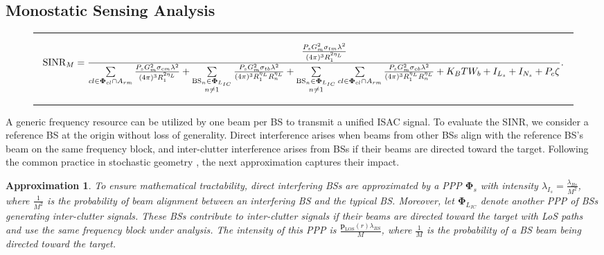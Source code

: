 \documentclass[journal]{IEEEtran}
\newtheorem{approximation}{\textbf{Approximation}}
\begin{document}
\subsection{Monostatic Sensing Analysis}



\begin{figure*}
\hrule
\begin{equation}\label{scnr_mono}
\text{SINR}_M=\frac{\frac{P_s  G_{m}^2 \sigma_{tm}  \lambda^2  }{(4\pi)^3 R_{1}^{2 \eta_L}}}{\sum\limits_{cl\in \bold\Phi_{cl}\cap A_{rm}}\frac{P_s G_{m}^2 \sigma_{cm} \lambda^2 }{(4\pi)^3 R_{1}^{2 \eta_L}}+\sum\limits_{\substack{\text{BS}_{n }\in \bold\Phi_{L_{IC}}\\ n \neq 1}} \frac{P_s  G_{m}^2 \sigma_{tb}  \lambda^2  }{(4\pi)^3 R_1^{\eta_L}  R_n^{\eta_L}}+\sum\limits_{\substack{\text{BS}_{n}\in \bold\Phi_{L_{IC}}\\ n \neq 1}}\sum\limits_{cl\in \bold\Phi_{cl}\cap A_{rm}}\frac{P_s  G_{m}^2 \sigma_{cb}  \lambda^2  }{(4\pi)^3 R_1^{\eta_L}  R_n^{\eta_L}}+K_B T W_b+I_{L_s}+I_{N_s}+ P_c \zeta  }.
\end{equation}
\hrule
\end{figure*}
A generic frequency resource can be utilized by one beam per BS to transmit a unified ISAC signal. 
To evaluate the SINR, we consider a reference BS at the origin without loss of generality. Direct interference arises when beams from other BSs align with the reference BS’s beam on the same frequency block, and inter-clutter interference arises from BSs if their beams are directed toward the target. Following the common practice in stochastic geometry \cite{elsawy2016modeling}, the next approximation captures their impact.
\begin{approximation}
To ensure mathematical tractability, direct interfering BSs are approximated by a PPP \(\boldsymbol{\Phi}_{s}\) with intensity \(\lambda_{I_s} =   \frac{\lambda_{Bs}}{M^2}\), where \(\frac{1}{M^2}\) is the probability of beam alignment between an interfering BS and the typical BS.  Moreover, let \(\boldsymbol{\Phi}_{L_{IC}}\) denote another PPP of BSs generating inter-clutter signals. These BSs contribute to inter-clutter signals if their beams are directed toward the target with LoS paths and use the same frequency block under analysis. The intensity of this PPP is \( \frac{\boldsymbol{p}_{\text{LOS}}(r) \lambda_{BS}}{M}\), where \(\frac{1}{M}\) is the probability of a BS beam being directed toward the target.
\label{approx_dir}
\end{approximation}
\end{document}

